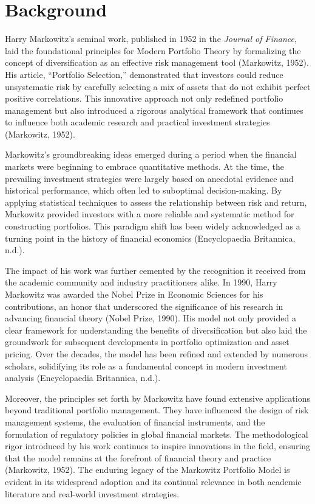 \documentclass[12pt]{article}
\begin{document}
\section{Background}
Harry Markowitz's seminal work, published in 1952 in the \textit{Journal of Finance}, laid the foundational principles for Modern Portfolio Theory by formalizing the concept of diversification as an effective risk management tool (Markowitz, 1952). His article, ``Portfolio Selection,'' demonstrated that investors could reduce unsystematic risk by carefully selecting a mix of assets that do not exhibit perfect positive correlations. This innovative approach not only redefined portfolio management but also introduced a rigorous analytical framework that continues to influence both academic research and practical investment strategies (Markowitz, 1952).

Markowitz’s groundbreaking ideas emerged during a period when the financial markets were beginning to embrace quantitative methods. At the time, the prevailing investment strategies were largely based on anecdotal evidence and historical performance, which often led to suboptimal decision-making. By applying statistical techniques to assess the relationship between risk and return, Markowitz provided investors with a more reliable and systematic method for constructing portfolios. This paradigm shift has been widely acknowledged as a turning point in the history of financial economics (Encyclopaedia Britannica, n.d.).

The impact of his work was further cemented by the recognition it received from the academic community and industry practitioners alike. In 1990, Harry Markowitz was awarded the Nobel Prize in Economic Sciences for his contributions, an honor that underscored the significance of his research in advancing financial theory (Nobel Prize, 1990). His model not only provided a clear framework for understanding the benefits of diversification but also laid the groundwork for subsequent developments in portfolio optimization and asset pricing. Over the decades, the model has been refined and extended by numerous scholars, solidifying its role as a fundamental concept in modern investment analysis (Encyclopaedia Britannica, n.d.).

Moreover, the principles set forth by Markowitz have found extensive applications beyond traditional portfolio management. They have influenced the design of risk management systems, the evaluation of financial instruments, and the formulation of regulatory policies in global financial markets. The methodological rigor introduced by his work continues to inspire innovations in the field, ensuring that the model remains at the forefront of financial theory and practice (Markowitz, 1952). The enduring legacy of the Markowitz Portfolio Model is evident in its widespread adoption and its continual relevance in both academic literature and real-world investment strategies.
\end{document}
